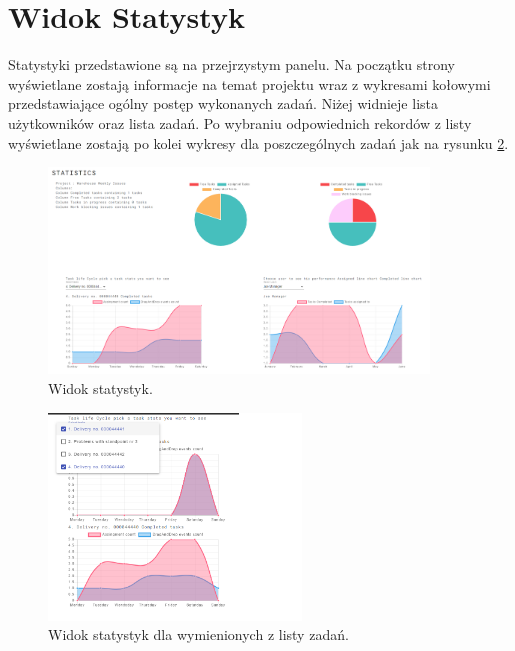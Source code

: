 \section{Widok Statystyk}
Statystyki przedstawione są na przejrzystym panelu. Na początku strony wyświetlane zostają informacje na temat projektu wraz z wykresami kołowymi przedstawiające ogólny postęp wykonanych zadań.
Niżej widnieje lista użytkowników oraz lista zadań. Po wybraniu odpowiednich rekordów z listy wyświetlane zostają po kolei wykresy dla poszczególnych zadań jak na rysunku \ref{scrolledstatistics}.
\begin{figure}[h!]
	\centering
	\includegraphics[width=0.90\textwidth]{statistics}
	
	\caption{Widok statystyk.}
	
	\label{statistics}
\end{figure}

\begin{figure}[h!]
	\centering
	\includegraphics[width=0.60\textwidth]{scrolledstatistics}
	
	\caption{Widok statystyk dla wymienionych z listy zadań.}
	
	\label{scrolledstatistics}
\end{figure}
\clearpage

